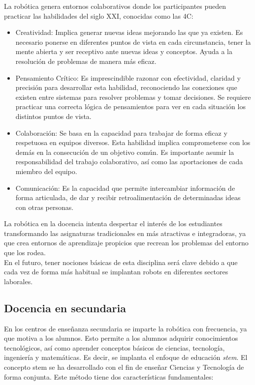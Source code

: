 La robótica genera entornos colaborativos donde los participantes pueden practicar las habilidades del siglo XXI, conocidas como las 4C:

\begin{itemize}
\item Creatividad: Implica generar nuevas ideas mejorando las que ya existen. Es necesario ponerse en diferentes puntos de vista en cada circunstancia, tener la mente abierta y ser receptivo ante nuevas ideas y conceptos. Ayuda a la resolución de problemas de manera más eficaz.
\item Pensamiento Crítico: Es imprescindible razonar con efectividad, claridad y precisión para desarrollar esta habilidad, reconociendo las conexiones que existen entre sistemas para resolver problemas y tomar decisiones. Se requiere practicar una correcta lógica de pensamientos para ver en cada situación los distintos puntos de vista.
\item Colaboración: Se basa en la capacidad para trabajar de forma eficaz y respetuosa en equipos diversos. Esta habilidad implica comprometerse con los demás en la consecución de un objetivo común. Es importante asumir la responsabilidad del trabajo colaborativo, así como las aportaciones de cada miembro del equipo.
\item Comunicación: Es la capacidad que permite intercambiar información de forma articulada, de dar y recibir retroalimentación de determinadas ideas con otras personas.
\end{itemize}

La robótica en la docencia intenta despertar el interés de los estudiantes transformando las asignaturas tradicionales en más atractivas e integradoras, ya que crea entornos de aprendizaje propicios que recrean los problemas del entorno que los rodea.\\

En el futuro, tener nociones básicas de esta disciplina será clave debido a que cada vez de forma más habitual se implantan robots en diferentes sectores laborales.

\subsection{Docencia en secundaria}

En los centros de enseñanza secundaria se imparte la robótica con frecuencia, ya que motiva a los alumnos. Esto permite a los alumnos adquirir conocimientos tecnológicos, así como aprender conceptos básicos de ciencias, tecnología, ingeniería y matemáticas. Es decir, se implanta el enfoque de educación \textit{\acrfull{stem}}. El concepto \acrshort{stem} se ha desarrollado con el fin de enseñar Ciencias y Tecnología de forma conjunta. Este método tiene dos características fundamentales:

